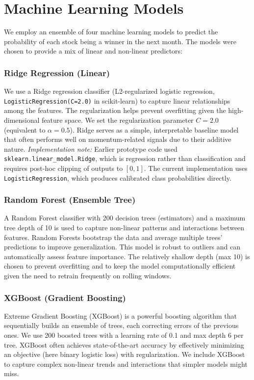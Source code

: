\documentclass[conference]{IEEEtran}
\begin{document}
\section{Machine Learning Models}\label{sec:models}
We employ an ensemble of four machine learning models to predict the probability of each stock being a winner in the next month. The models were chosen to provide a mix of linear and non-linear predictors:

\subsubsection{Ridge Regression (Linear)}
We use a Ridge regression classifier (L2-regularized logistic regression, \texttt{LogisticRegression(C=2.0)} in scikit-learn) to capture linear relationships among the features. The regularization helps prevent overfitting given the high-dimensional feature space. We set the regularization parameter $C=2.0$ (equivalent to $\alpha = 0.5$). Ridge serves as a simple, interpretable baseline model that often performs well on momentum-related signals due to their additive nature. \emph{Implementation note:} Earlier prototype code used \texttt{sklearn.linear\_model.Ridge}, which is regression rather than classification and requires post-hoc clipping of outputs to $[0,1]$. The current implementation uses \texttt{LogisticRegression}, which produces calibrated class probabilities directly.

\subsubsection{Random Forest (Ensemble Tree)}
A Random Forest classifier with 200 decision trees (estimators) and a maximum tree depth of 10 is used to capture non-linear patterns and interactions between features. Random Forests bootstrap the data and average multiple trees' predictions to improve generalization. This model is robust to outliers and can automatically assess feature importance. The relatively shallow depth (max 10) is chosen to prevent overfitting and to keep the model computationally efficient given the need to retrain frequently on rolling windows.

\subsubsection{XGBoost (Gradient Boosting)}
Extreme Gradient Boosting (XGBoost) is a powerful boosting algorithm that sequentially builds an ensemble of trees, each correcting errors of the previous ones. We use 200 boosted trees with a learning rate of 0.1 and max depth 6 per tree. XGBoost often achieves state-of-the-art accuracy by effectively minimizing an objective (here binary logistic loss) with regularization. We include XGBoost to capture complex non-linear trends and interactions that simpler models might miss.
\end{document}
